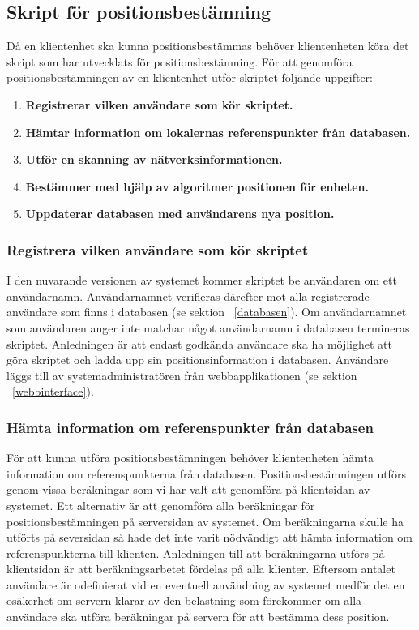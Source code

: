 \documentclass[a4paper,12pt]{article}
\begin{document}
 \subsection{Skript för positionsbestämning}
 Då en klientenhet ska kunna positionsbestämmas behöver klientenheten köra det skript som har utvecklats för positionsbestämning. För att genomföra positionsbestämningen av en klientenhet utför skriptet följande uppgifter:
 \begin{enumerate}
   \item \textbf{Registrerar vilken användare som kör skriptet.}
   \item \textbf{Hämtar information om lokalernas referenspunkter från databasen.}
   \item \textbf{Utför en skanning av nätverksinformationen.}
   \item \textbf{Bestämmer med hjälp av algoritmer positionen för enheten.}
   \item \textbf{Uppdaterar databasen med användarens nya position.}
 \end{enumerate}


 \subsubsection{Registrera vilken användare som kör skriptet}
 I den nuvarande versionen av systemet kommer skriptet be användaren om ett användarnamn. Användarnamnet verifieras därefter mot alla registrerade användare som finns i databasen (se sektion ~\ref{databasen}). Om användarnamnet som användaren anger inte matchar något användarnamn i databasen termineras skriptet. Anledningen är att endast godkända användare ska ha möjlighet att göra skriptet och ladda upp sin positionsinformation i databasen. Användare läggs till av systemadministratören från webbapplikationen (se sektion ~\ref{webbinterface}).

 \subsubsection{Hämta information om referenspunkter från databasen}\label{HamtaInfoDB}
 För att kunna utföra positionsbestämningen behöver klientenheten hämta information om referenspunkterna från databasen. Positionsbestämningen utförs genom vissa beräkningar som vi har valt att genomföra på klientsidan av systemet. Ett alternativ är att genomföra alla beräkningar för positionsbestämningen på serversidan av systemet. Om beräkningarna skulle ha utförts på seversidan så hade det inte varit nödvändigt att hämta information om referenspunkterna till klienten. Anledningen till att beräkningarna utförs på klientsidan är att beräkningsarbetet fördelas på alla klienter. Eftersom antalet användare är odefinierat vid en eventuell användning av systemet medför det en osäkerhet om servern klarar av den belastning som förekommer om alla användare ska utföra beräkningar på servern för att bestämma dess position.
\end{document}
